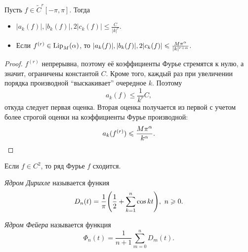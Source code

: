 \begin{corollary}
    Пусть $f \in \widetilde{C}^r[-\pi, \pi]$. Тогда
    \begin{itemize}
        \item $|a_k(f)|, |b_k(f)|, 2|c_k(f)| \leqslant \frac{C}{|k|^r}$.
        \item Если $f^{(r)} \in \operatorname{Lip}_M(\alpha)$, то $|a_k(f)|, |b_k(f)|, 2|c_k(f)|
            \leqslant \frac{M \pi^\alpha}{|k|^{r + \alpha}}$.
    \end{itemize}
\end{corollary}
\begin{proof}
    $f^{(r)}$ непрерывна, поэтому её коэффициенты Фурье стремятся к нулю, а значит,
    ограничены константой $C$. Кроме того, каждый раз при увеличении порядка
    производной ``выскакивает'' очередное $k$. Поэтому
    \[
        a_k(f) \leqslant \frac{1}{k^r} C 
    ,\]
    откуда следует первая оценка. Вторая оценка получается из первой с учетом
    более строгой оценки на коэффициенты Фурье производной:
    \[
        a_k(f^{(r)}) \leqslant \frac{M \pi^\alpha}{k^\alpha}
    .\]
\end{proof}

\begin{corollary}
    Если $f \in C^2$, то ряд Фурье $f$ сходится.
\end{corollary}

\begin{definition}
    \textit{Ядром Дирихле} называется функия
    \[
        D_n(t) = \frac{1}{\pi}\parens*{\frac{1}{2} + \sum_{k = 1}^n{\cos{kt}}},~ n \geqslant 0
    .\]
\end{definition}

\begin{definition}
    \textit{Ядром Фейера} называется функция
    \[
        \Phi_n(t) = \frac{1}{n + 1} \sum_{m = 0}^n{D_m(t)}
    .\]
\end{definition}

